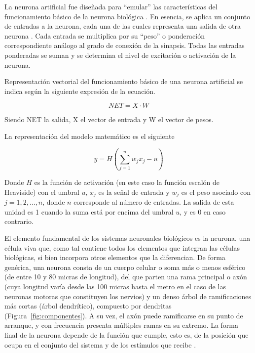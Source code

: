 \vspace{1\baselineskip}
La neurona artificial fue diseñada para “emular” las características del funcionamiento básico de la neurona biológica \cite{basogain2008redes}. En esencia, se aplica un conjunto de entradas a la neurona, cada una de las cuales representa una salida de otra neurona . Cada entrada se multiplica por su “peso” o ponderación correspondiente análogo al grado de conexión de la sinapsis. Todas las entradas ponderadas se suman y se determina el nivel de excitación o activación de la neurona.

\vspace{1\baselineskip}
Representación vectorial del funcionamiento básico de una neurona artificial se
indica según la siguiente expresión de la ecuación.

\[
  NET = X \cdot W
\]

Siendo NET la salida, X el vector de entrada y W el vector de pesos.

\vspace{1\baselineskip}
La representación del modelo matemático es el siguiente

\begin{equation}
  y = H\left(\sum_{j=1}^{n} w_jx_j - u\right)
\end{equation}

Donde \(H\) es la función de activación (en este caso la función escalón de
Heaviside) con el umbral \(u\), \(x_j\) es la señal de entrada y \(w_j\) es el
peso asociado con \(j = 1,2,\ldots,n\), donde \(n\) corresponde al número de
entradas. La salida de esta unidad es 1 cuando la suma está por encima del
umbral \(u\), y es 0 en caso contrario\cite{arana2021redes}.

\vspace{1\baselineskip}
El elemento fundamental de los sistemas neuronales biológicos es la neurona, una célula viva que, como tal contiene todos los elementos que integran las células biológicas, si bien incorpora otros elementos que la diferencian. De forma genérica, una neurona consta de un cuerpo celular o soma más o menos esférico (de entre 10 y 80 micras de longitud), del que parten una rama principal o axón (cuya longitud varía desde las 100 micras hasta el metro en el caso de las neuronas motoras que constituyen los nervios) y un denso árbol de ramificaciones más cortas (árbol dendrítico), compuesto por dendritas  (Figura~\ref{fig:componentes}). A su vez, el axón puede ramificarse en su punto de arranque, y con frecuencia presenta múltiples ramas en su extremo. La forma final de la neurona depende de la función que cumple, esto es, de la posición que ocupa en el conjunto del sistema y de los estímulos que recibe \cite{lopez2008redes}.

